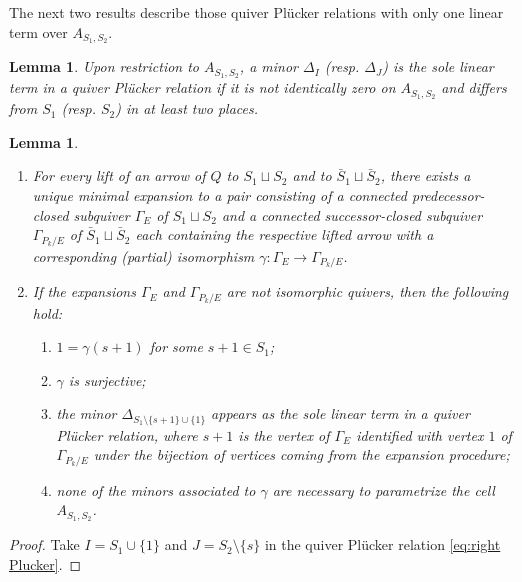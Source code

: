 \documentclass{amsart}
\newtheorem{lemma}[theorem]{Lemma}
\numberwithin{equation}{section}
\begin{document}
  The next two results describe those quiver Pl\"ucker relations with only one linear term over $A_{S_1,S_2}$.
  \begin{lemma}
    Upon restriction to $A_{S_1,S_2}$, a minor $\Delta_I$ (resp. $\Delta_J$) is the sole linear term in a quiver Pl\"ucker relation if it is not identically zero on $A_{S_1,S_2}$ and differs from $S_1$ (resp. $S_2$) in at least two places.
  \end{lemma}
  \begin{lemma}
    \mbox{}
    \begin{enumerate}
      \item For every lift of an arrow of $Q$ to $S_1\sqcup S_2$ and to $\bar{S}_1\sqcup \bar{S}_2$, there exists a unique minimal expansion to a pair consisting of a connected predecessor-closed subquiver $\Gamma_E$ of $S_1\sqcup S_2$ and a connected successor-closed subquiver $\Gamma_{P_k/E}$ of $\bar{S}_1\sqcup \bar{S}_2$ each containing the respective lifted arrow with a corresponding (partial) isomorphism $\gamma:\Gamma_E\to\Gamma_{P_k/E}$.
      \item If the expansions $\Gamma_E$ and $\Gamma_{P_k/E}$ are not isomorphic quivers, then the following hold:
        \begin{enumerate}
          \item $1=\gamma(s+1)$ for some $s+1\in S_1$;
          \item $\gamma$ is surjective;
          \item the minor $\Delta_{S_1\setminus\{s+1\}\cup\{1\}}$ appears as the sole linear term in a quiver Pl\"ucker relation, where $s+1$ is the vertex of $\Gamma_E$ identified with vertex $1$ of $\Gamma_{P_k/E}$ under the bijection of vertices coming from the expansion procedure;
          \item none of the minors associated to $\gamma$ are necessary to parametrize the cell $A_{S_1,S_2}$.
        \end{enumerate}
    \end{enumerate}
  \end{lemma}
  \begin{proof}
    Take $I=S_1\cup\{1\}$ and $J=S_2\setminus\{s\}$ in the quiver Pl\"ucker relation \eqref{eq:right Plucker}.
  \end{proof}
\end{document}
